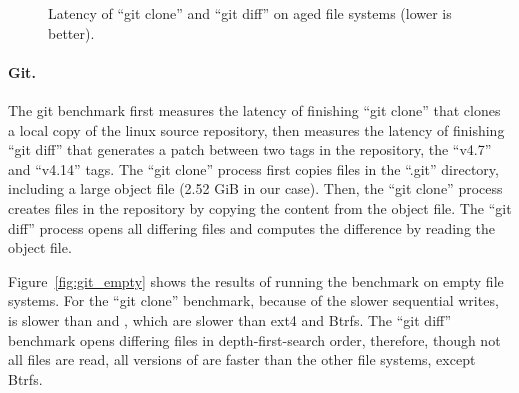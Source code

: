 \begin{figure}[t]
    \centering
    \caption[Git benchmark on aged file systems]{\label{fig:git_aged}
        Latency of ``git clone'' and ``git diff'' on aged file systems (lower is better).}
\end{figure}

\paragraph{Git.}

The git benchmark first measures the latency of finishing ``git clone'' that
clones a local copy of the linux source repository,
then measures the latency of finishing ``git diff'' that generates a patch
between two tags in the repository, the ``v4.7'' and ``v4.14'' tags.
The ``git clone'' process first copies files in the ``.git'' directory,
including a large object file (2.52 GiB in our case).
Then, the ``git clone'' process creates files in the repository by copying the
content from the object file.
The ``git diff'' process opens all differing files and computes the difference
by reading the object file.

Figure~\ref{fig:git_empty} shows the results of running the benchmark on empty file
systems.
For the ``git clone'' benchmark,
because of the slower sequential writes,
\betrfsFour is slower than \betrfsThree and \betrfsFive,
which are slower than ext4 and Btrfs.
The ``git diff'' benchmark opens differing files in depth-first-search order,
therefore, though not all files are read,
all versions of \betrfs are faster than the other file systems, except Btrfs.

